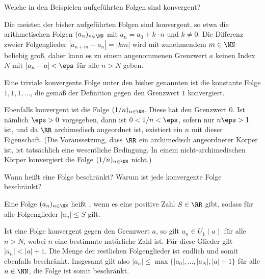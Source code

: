 \begin{frage}%
  \label{02_fbsp}
  Welche in den Beispielen aufgeführten Folgen sind konvergent?
\end{frage}

\begin{antwort}
  Die meisten der bisher aufgeführten Folgen sind  
  konvergent, so etwa die arithmetischen Folgen $(a_n)_{n\in\NN}$ mit 
  $a_n=a_0+k\cdot n$ und $k\not=0$. Die Differenz zweier Folgenglieder 
  $|a_{n+m}-a_n|=|km|$ wird mit zunehmendem $m\in\NN$ beliebig groß, 
  daher kann es zu einem angenommenen Grenzwert $a$ keinen Index $N$ mit
  $|a_n-a| < \eps$ für alle $n>N$ geben. 

  Eine triviale konvergente Folge unter den bisher genannten ist die 
  konstante Folge $1,1,1,\ldots$, die gemäß der Definition 
  gegen den Grenzwert $1$ konvergiert.  

  Ebenfalls konvergent ist die Folge $(1/n)_{n\in\NN}$. Diese hat den Grenzwert 
  $0$. Ist nämlich $\eps>0$ vorgegeben, dann ist $0<1/n<\eps$, sofern 
  nur $n\eps > 1$ ist, und da $\RR$ archimedisch angeordnet ist, 
  existiert ein $n$ mit dieser Eigenschaft. 
  (Die Voraussetzung, dass $\RR$ ein archimedisch 
  angeordneter Körper ist, ist tatsächlich eine wesentliche Bedingung. In einem 
  nicht-archimedischen Körper konvergiert die Folge $(1/n)_{n\in\NN}$ nicht.)   
  \AntEnd
\end{antwort}

\begin{frage}%
  \label{02_fbes}
  Wann heißt eine Folge beschränkt? Warum ist jede konvergente Folge 
  beschränkt? 
\end{frage}

\begin{antwort}
  Eine Folge $(a_n)_{n\in\NN}$ heißt 
  , wenn es eine positive Zahl $S\in\RR$ gibt, 
  sodass für alle Folgenglieder $|a_n| \le S$ gilt.

  Ist eine Folge konvergent 
  gegen den Grenzwert $a$, so gilt $a_n\in U_1(a)$ für 
  alle $n>N$, wobei $n$ eine bestimmte natürliche Zahl ist. 
  Für diese Glieder gilt $|a_n| < |a|+1$. Die Menge der restlichen Folgenglieder 
  ist endlich und somit ebenfalls beschränkt. Insgesamt gilt also 
  $|a_n| \le \max\{|a_0|,\ldots,|a_{N}|, |a|+1 \}$ für alle $n\in\NN$, die 
  Folge ist somit beschränkt.
  \AntEnd
\end{antwort} 

